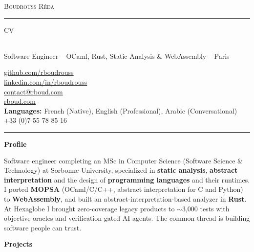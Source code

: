 \documentclass[10pt,A4]{article}
\newcommand{\cvsection}[1]
{
	\begin{center}
		\large\textcolor{sectcol}{\textbf{#1}}
	\end{center}
}
\newcommand{\metasection}[2]
{
\footnotesize{#2} \hspace*{\fill} \footnotesize{#1}\\[1pt]
}
\begin{document}
\pagestyle{fancy}


\vspace{-8pt}
\begin{center}
    {\HUGE \textsc{Boudrouss Réda} \textcolor{sectcol}{\rule[-1mm]{1mm}{0.9cm}} \textsc{CV}}\\[2pt]
    {\small Software Engineer -- OCaml, Rust, Static Analysis \& WebAssembly -- Paris}
\end{center}

\vspace{6pt}

\metasection{\href{https://github.com/rboudrouss}{github.com/rboudrouss}}{}
\metasection{\href{https://www.linkedin.com/in/rboudrouss}{linkedin.com/in/rboudrouss}}{}
\metasection{\href{mailto:contact@rboud.com}{contact@rboud.com}}{}
\metasection{\href{https://rboud.com}{rboud.com}}{}
\metasection{+33 (0)7 55 78 85 16}{\textbf{Languages:} French (Native), English (Professional), Arabic (Conversational)}

\vspace{-15pt}
\textcolor{softcol}{\hrule}

\normalsize

\cvsection{Profile}
Software engineer completing an MSc in Computer Science (Software Science \& Technology) at Sorbonne University, specialized in \textbf{static analysis}, \textbf{abstract interpretation} and the design of \textbf{programming languages} and their runtimes. I ported \textbf{MOPSA} (OCaml/C/C++, abstract interpretation for C and Python) to \textbf{WebAssembly}, and built an abstract-interpretation-based analyzer in \textbf{Rust}. At Hexaglobe I brought zero-coverage legacy products to $\sim$3,000 tests with objective oracles and verification-gated AI agents. The common thread is building software people can trust.

\cvsection{Projects}
\end{document}
